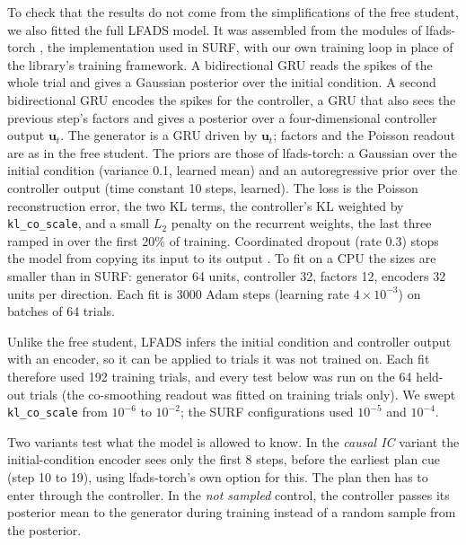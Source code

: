 \documentclass[11pt,a4paper]{article}
\newcommand{\vect}[1]{\bm{#1}}
\newcommand{\kl}{\texttt{kl\_co\_scale}}
\begin{document}
To check that the results do not come from the simplifications of the free student, we also fitted the full LFADS model. It was assembled from the modules of lfads-torch \citep{sedler2023}, the implementation used in SURF, with our own training loop in place of the library's training framework. A bidirectional GRU \citep{cho2014} reads the spikes of the whole trial and gives a Gaussian posterior over the initial condition. A second bidirectional GRU encodes the spikes for the controller, a GRU that also sees the previous step's factors and gives a posterior over a four-dimensional controller output $\vect u_t$. The generator is a GRU driven by $\vect u_t$; factors and the Poisson readout are as in the free student. The priors are those of lfads-torch: a Gaussian over the initial condition (variance 0.1, learned mean) and an autoregressive prior over the controller output (time constant 10 steps, learned). The loss is the Poisson reconstruction error, the two KL terms, the controller's KL weighted by \kl{}, and a small $L_2$ penalty on the recurrent weights, the last three ramped in over the first 20\% of training. Coordinated dropout (rate 0.3) stops the model from copying its input to its output \citep{keshtkaran2019}. To fit on a CPU the sizes are smaller than in SURF: generator 64 units, controller 32, factors 12, encoders 32 units per direction. Each fit is 3000 Adam steps (learning rate $4\times10^{-3}$) on batches of 64 trials.

Unlike the free student, LFADS infers the initial condition and controller output with an encoder, so it can be applied to trials it was not trained on. Each fit therefore used 192 training trials, and every test below was run on the 64 held-out trials (the co-smoothing readout was fitted on training trials only). We swept \kl{} from $10^{-6}$ to $10^{-2}$; the SURF configurations used $10^{-5}$ and $10^{-4}$.

Two variants test what the model is allowed to know. In the \emph{causal IC} variant the initial-condition encoder sees only the first 8 steps, before the earliest plan cue (step 10 to 19), using lfads-torch's own option for this. The plan then has to enter through the controller. In the \emph{not sampled} control, the controller passes its posterior mean to the generator during training instead of a random sample from the posterior.
\end{document}
